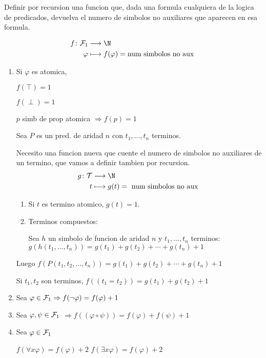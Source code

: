 \begin{example}
	Definir por recursion una funcion que, dada una formula cualquiera de la logica de predicados, devuelva el numero de simbolos no auxiliares que aparecen en esa formula.

	\[
		\begin{aligned}
			f\colon \mathcal{\MakeUppercase{f}}_1 & \longrightarrow \N                                   \\
			\varphi                               & \longmapsto f(\varphi) = \text{num simbolos no aux }
		\end{aligned}
	\]

	\begin{enumerate}
		\item Si \(\varphi\) es atomica,

		      \(f(\top) = 1\)

		      \(f(\perp) = 1 \)

		      \(p \) simb de prop atomica \(\Rightarrow f(p) = 1\)

		      Sea \(P \) es un pred. de aridad \(n \) con \(t_1,\ldots,t_n \) terminos.

		      Necesito una funcion nueva que cuente el numero de simbolos no auxiliares de un termino, que vamos a definir tambien por recursion.
		      \[
			      \begin{aligned}
				      g \colon \mathcal{\MakeUppercase{t}} & \longrightarrow \N                                \\
				      t                                    & \longmapsto g (t ) = \text{ num simbolos no aux }
			      \end{aligned}
		      \]
		      \begin{enumerate}
			      \item Si \(t \) es termino atomico, \(g(t) = 1 \).
			      \item Terminos compuestos:

			            Sea \(h \) un simbolo de funcion de aridad \(n \) y \(t_1,\ldots,t_n \) terminos: \(g(h(t_1,\ldots,t_n)) = g(t_1) + g(t_2) + \cdots + g(t_n) + 1\)
		      \end{enumerate}

		      Luego \(f(P(t_1,t_2,\ldots,t_n)) = g(t_1) + g(t_2) + \cdots + g(t_n) + 1\)

		      Si \(t_1,t_2 \) son terminos, \(f((t_1=t_2)) = g(t_1) + g(t_2) + 1 \)

		\item Sea \(\varphi \in \mathcal{\MakeUppercase{f}}_1 \Rightarrow f(\neg \varphi) = f(\varphi) + 1\)
		\item Sea \(\varphi, \psi \in \mathcal{\MakeUppercase{f}}_1 \) \(\Rightarrow f((\varphi \circ \psi)) = f(\varphi) + f(\psi) + 1 \)
		\item Sea \(\varphi \in \mathcal{\MakeUppercase{f}}_1 \)

		      \(f(\forall x \varphi) = f(\varphi) + 2\)
		      \(f(\exists x \varphi) = f(\varphi) + 2\)
	\end{enumerate}
\end{example}

